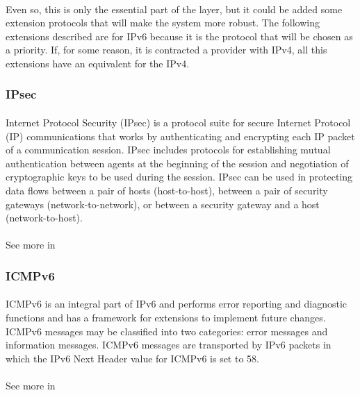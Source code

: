\paragraph{}
Even so, this is only the essential part of the layer, but it could be added some extension protocols that will make the system more robust. The following extensions described are for IPv6 because it is the protocol that will be chosen as a priority. If, for some reason, it is contracted a provider with IPv4, all this extensions have an equivalent for the IPv4.

\subsubsection{IPsec}
\paragraph{}
Internet Protocol Security (IPsec) is a protocol suite for secure Internet Protocol (IP) communications that works by authenticating and encrypting each IP packet of a communication session. IPsec includes protocols for establishing mutual authentication between agents at the beginning of the session and negotiation of cryptographic keys to be used during the session. IPsec can be used in protecting data flows between a pair of hosts (host-to-host), between a pair of security gateways (network-to-network), or between a security gateway and a host (network-to-host). 
\paragraph{}
See more in \cite{IPsec}

\subsubsection{ICMPv6}
\paragraph{}
ICMPv6 is an integral part of IPv6 and performs error reporting and diagnostic functions and has a framework for extensions to implement future changes. ICMPv6 messages may be classified into two categories: error messages and information messages. ICMPv6 messages are transported by IPv6 packets in which the IPv6 Next Header value for ICMPv6 is set to 58.
\paragraph{}
See more in \cite{ICMP}

